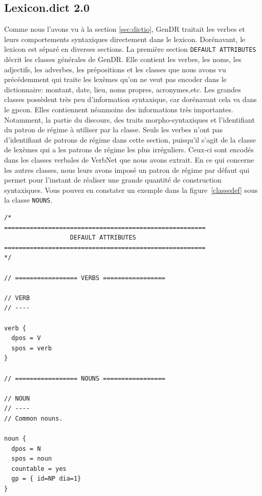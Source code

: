 \subsection{Lexicon.dict 2.0}
Comme nous l'avons vu à la section \ref{sec:dictio}, GenDR traitait les verbes et leurs comportements syntaxiques directement dans le lexicon. Dorénavant, le lexicon est séparé en diverses sections. La première section \texttt{DEFAULT ATTRIBUTES} décrit les classes générales de GenDR. Elle contient les verbes, les noms, les adjectifs, les adverbes, les prépositions et les classes que nous avons vu précédemment qui traite les lexèmes qu'on ne veut pas encoder dans le dictionnaire: montant, date, lieu, noms propres, acronymes,etc. Les grandes classes possèdent très peu d'information syntaxique, car dorénavant cela va dans le gpcon. Elles contiennent néanmoins des informations très importantes. Notamment, la partie du discours, des traits morpho-syntaxiques et l'identifiant du patron de régime à utiliser par la classe. Seuls les verbes n'ont pas d'identifiant de patrons de régime dans cette section, puisqu'il s'agit de la classe de lexèmes qui a les patrons de régime les plus irréguliers. Ceux-ci sont encodés dans les classes verbales de VerbNet que nous avons extrait. En ce qui concerne les autres classes, nous leurs avons imposé un patron de régime par défaut qui permet pour l'instant de réaliser une grande quantité de construction syntaxiques. Vous pouvez en constater un exemple dans la figure~\ref{classedef} sous la classe \texttt{NOUNS}.

\begin{lstlisting}[language=XML, caption = Attributs par défaut des classes, label=classedef]
/*
=======================================================
                  DEFAULT ATTRIBUTES
=======================================================
*/

// ================= VERBS =================

// VERB
// ----

verb {
  dpos = V
  spos = verb
}

// ================= NOUNS =================

// NOUN
// ----
// Common nouns.

noun {
  dpos = N
  spos = noun
  countable = yes
  gp = { id=NP dia=1}
}
\end{lstlisting}

